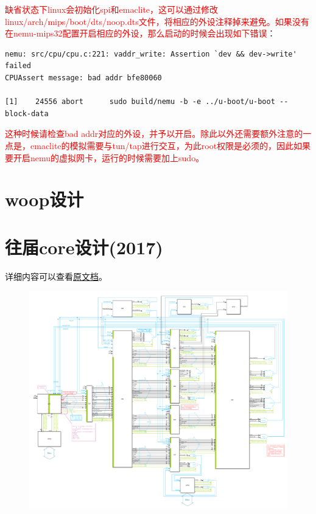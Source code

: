 \documentclass[lang=cn,11pt,a4paper]{elegantpaper}
\begin{document}
\textcolor{red}{缺省状态下linux会初始化spi和emaclite，这可以通过修改linux/arch/mips/boot/dts/noop.dts文件，将相应的外设注释掉来避免。如果没有在nemu-mips32配置开启相应的外设，那么启动的时候会出现如下错误}：
\begin{lstlisting}
nemu: src/cpu/cpu.c:221: vaddr_write: Assertion `dev && dev->write' failed
CPUAssert message: bad addr bfe80060

[1]    24556 abort      sudo build/nemu -b -e ../u-boot/u-boot --block-data
\end{lstlisting}
\textcolor{red}{这种时候请检查bad addr对应的外设，并予以开启。除此以外还需要额外注意的一点是，emaclite的模拟需要与tun/tap进行交互，为此root权限是必须的，因此如果要开启nemu的虚拟网卡，运行的时候需要加上sudo。}

\section{woop设计}



\section{往届core设计(2017)}

详细内容可以查看\href{run:../manuals/2017-I4-NOOP.pdf}{原文档}。

\begin{figure}[H]
\centering
\includegraphics[width=\linewidth]{image/core-I4-2017}
\end{figure}
\end{document}
